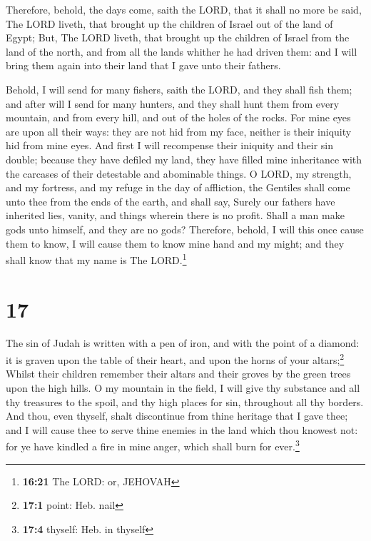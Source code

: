  Therefore, behold, the days come, saith the LORD, that
it shall no more be said, The LORD liveth, that brought up the children
of Israel out of the land of Egypt;  But, The LORD
liveth, that brought up the children of Israel from the land of the
north, and from all the lands whither he had driven them: and I will
bring them again into their land that I gave unto their fathers.

 Behold, I will send for many fishers, saith the LORD,
and they shall fish them; and after will I send for many hunters, and
they shall hunt them from every mountain, and from every hill, and out
of the holes of the rocks.  For mine eyes are upon all
their ways: they are not hid from my face, neither is their iniquity hid
from mine eyes.  And first I will recompense their
iniquity and their sin double; because they have defiled my land, they
have filled mine inheritance with the carcases of their detestable and
abominable things.  O LORD, my strength, and my fortress,
and my refuge in the day of affliction, the Gentiles shall come unto
thee from the ends of the earth, and shall say, Surely our fathers have
inherited lies, vanity, and things wherein there is no profit.
 Shall a man make gods unto himself, and they are no
gods?  Therefore, behold, I will this once cause them to
know, I will cause them to know mine hand and my might; and they shall
know that my name is The LORD.\footnote{\textbf{16:21} The LORD: or,
  JEHOVAH}

\hypertarget{section-16}{%
\section{17}\label{section-16}}

 The sin of Judah is written with a pen of iron, and with
the point of a diamond: it is graven upon the table of their heart, and
upon the horns of your altars;\footnote{\textbf{17:1} point: Heb. nail}
 Whilst their children remember their altars and their
groves by the green trees upon the high hills.  O my
mountain in the field, I will give thy substance and all thy treasures
to the spoil, and thy high places for sin, throughout all thy borders.
 And thou, even thyself, shalt discontinue from thine
heritage that I gave thee; and I will cause thee to serve thine enemies
in the land which thou knowest not: for ye have kindled a fire in mine
anger, which shall burn for ever.\footnote{\textbf{17:4} thyself: Heb.
  in thyself}

